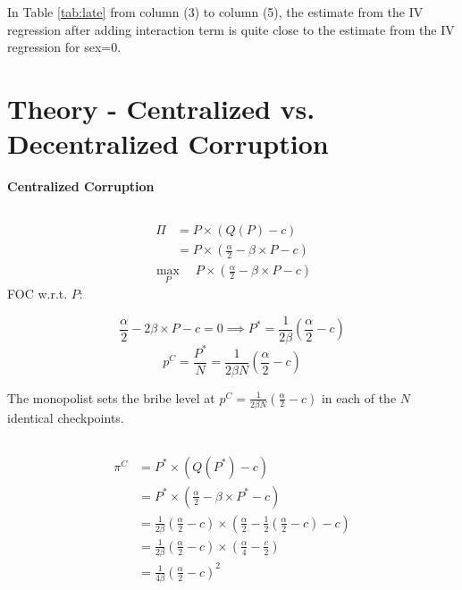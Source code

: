 \documentclass[a4paper]{article}
\begin{document}
In Table \ref{tab:late} from column (3) to column (5), the estimate from the IV regression after adding interaction term is quite close to the estimate from the IV regression for sex=0.

\section{Theory - Centralized vs. Decentralized Corruption}

\textbf{Centralized Corruption}

\subsection{}

\begin{align*}
    \Pi&=P\times (Q(P)-c) \\
    &=P\times\left(\frac{\alpha}{2}-\beta\times P-c\right)
\end{align*}
\begin{align*}
    \max_{P}\quad P\times\left(\frac{\alpha}{2}-\beta\times P-c\right)
\end{align*}
FOC w.r.t. $P$:

\begin{equation*}
    \frac{\alpha}{2}-2\beta\times P-c=0\implies P^{*}=\frac{1}{2\beta}\left(\frac{\alpha}{2}-c\right)
\end{equation*}
\begin{equation*}
    p^C=\frac{P^*}{N}=\frac{1}{2\beta N}\left(\frac{\alpha}{2}-c\right)
\end{equation*}

The monopolist sets the bribe level at $p^C=\frac{1}{2\beta N}\left(\frac{\alpha}{2}-c\right)$ in each of the $N$ identical checkpoints.

\subsection{}

\begin{align*}
    \pi^C&=P^*\times (Q(P^*)-c) \\
    &=P^*\times\left(\frac{\alpha}{2}-\beta\times P^*-c\right) \\
    &=\frac{1}{2\beta}\left(\frac{\alpha}{2}-c\right)\times
    \left(\frac{\alpha}{2}-\frac{1}{2}\left(\frac{\alpha}{2}-c\right)-c\right) \\
    &=\frac{1}{2\beta}\left(\frac{\alpha}{2}-c\right)\times\left(\frac{\alpha}{4}-\frac{c}{2}\right) \\
    &=\frac{1}{4\beta}\left(\frac{\alpha}{2}-c\right)^2
\end{align*}
\end{document}
